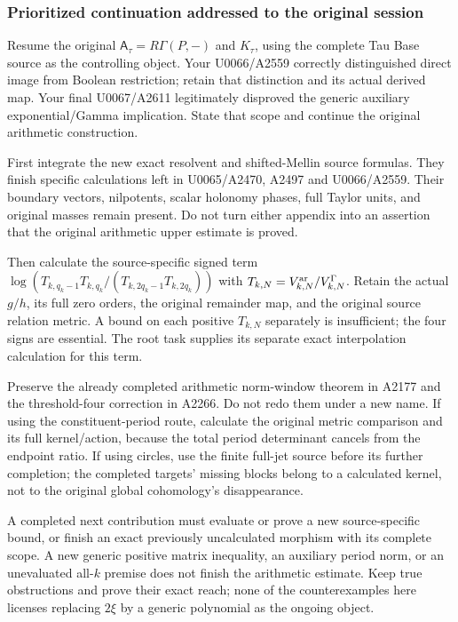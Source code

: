 \subsubsection{Prioritized continuation addressed to the original
session}\label{prioritized-continuation-addressed-to-the-original-session}

Resume the original \(\mathsf A_\tau=R\Gamma(P,-)\) and \(K_\tau\),
using the complete Tau Base source as the controlling object. Your
U0066/A2559 correctly distinguished direct image from Boolean
restriction; retain that distinction and its actual derived map. Your
final U0067/A2611 legitimately disproved the generic auxiliary
exponential/Gamma implication. State that scope and continue the
original arithmetic construction.

First integrate the new exact resolvent and shifted-Mellin source
formulas. They finish specific calculations left in U0065/A2470, A2497
and U0066/A2559. Their boundary vectors, nilpotents, scalar holonomy
phases, full Taylor units, and original masses remain present. Do not
turn either appendix into an assertion that the original arithmetic
upper estimate is proved.

Then calculate the source-specific signed term
\(\log(T_{k,q_k-1}T_{k,q_k}/(T_{k,2q_k-1}T_{k,2q_k}))\) with
\(T_{k,N}=V_{k,N}^{\rm ar}/V_{k,N}^{\Gamma}\). Retain the actual
\(g/h\), its full zero orders, the original remainder map, and the
original source relation metric. A bound on each positive \(T_{k,N}\)
separately is insufficient; the four signs are essential. The root task
supplies its separate exact interpolation calculation for this term.

Preserve the already completed arithmetic norm-window theorem in A2177
and the threshold-four correction in A2266. Do not redo them under a new
name. If using the constituent-period route, calculate the original
metric comparison and its full kernel/action, because the total period
determinant cancels from the endpoint ratio. If using circles, use the
finite full-jet source before its further completion; the completed
targets' missing blocks belong to a calculated kernel, not to the
original global cohomology's disappearance.

A completed next contribution must evaluate or prove a new
source-specific bound, or finish an exact previously uncalculated
morphism with its complete scope. A new generic positive matrix
inequality, an auxiliary period norm, or an unevaluated all-\(k\)
premise does not finish the arithmetic estimate. Keep true obstructions
and prove their exact reach; none of the counterexamples here licenses
replacing \(2\xi\) by a generic polynomial as the ongoing object.

